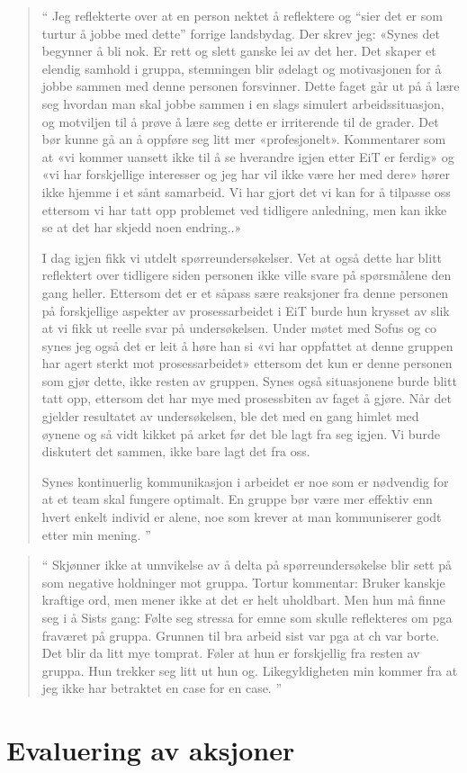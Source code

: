 \begin{quote}``
Jeg reflekterte over at en person nektet å reflektere og “sier det er som turtur å jobbe med dette” forrige 
landsbydag.  Der skrev jeg: «Synes det begynner å bli nok. Er rett og slett ganske lei av det her. Det skaper et 
elendig samhold i gruppa, stemningen blir ødelagt og motivasjonen for å jobbe sammen med denne personen 
forsvinner. Dette faget går ut på å lære seg hvordan man skal jobbe sammen i en slags simulert arbeidssituasjon, 
og motviljen til å prøve å lære seg dette er irriterende til de grader. Det bør kunne gå an å oppføre seg litt mer 
«profesjonelt». Kommentarer som at «vi kommer uansett ikke til å se hverandre igjen etter EiT er ferdig» og «vi har 
forskjellige interesser og jeg har vil ikke være her med dere» hører ikke hjemme i et sånt samarbeid. Vi har gjort det 
vi kan for å tilpasse oss ettersom vi har tatt opp problemet ved tidligere anledning, men kan ikke se at det har 
skjedd noen endring..»

I dag igjen fikk vi utdelt spørreundersøkelser. Vet at også dette har blitt reflektert over tidligere siden personen ikke 
ville svare på spørsmålene den gang heller. Ettersom det er et såpass sære reaksjoner fra denne personen på 
forskjellige aspekter av prosessarbeidet i EiT burde hun krysset av slik at vi fikk ut reelle svar på undersøkelsen. 
Under møtet med Sofus og co synes jeg også det er leit å høre han si «vi har oppfattet at denne gruppen har agert 
sterkt mot prosessarbeidet» ettersom det kun er denne personen som gjør dette, ikke resten av gruppen. Synes 
også situasjonene burde blitt tatt opp, ettersom det har mye med prosessbiten av faget å gjøre. Når det gjelder 
resultatet av undersøkelsen, ble det med en gang himlet med øynene og så vidt kikket på arket før det ble lagt fra 
seg igjen. Vi burde diskutert det sammen, ikke bare lagt det fra oss.

Synes kontinuerlig kommunikasjon i arbeidet er noe som er nødvendig for at et team skal fungere optimalt. En 
gruppe bør være mer effektiv enn hvert enkelt individ er alene, noe som krever at man kommuniserer godt etter min 
mening.
''\end{quote} 

\begin{quote}``
Skjønner ikke at unnvikelse av å delta på spørreundersøkelse blir sett på som negative holdninger mot gruppa. 
Tortur kommentar: Bruker kanskje kraftige ord, men mener ikke at det er helt uholdbart. Men hun må finne seg i å 
Sists gang: Følte seg stressa for emne som skulle reflekteres om pga fraværet på gruppa. 
Grunnen til bra arbeid sist var pga at ch var borte. Det blir da litt mye tomprat. 
Føler at hun er forskjellig fra resten av gruppa. Hun trekker seg litt ut hun og. 
Likegyldigheten min kommer fra at jeg ikke har betraktet en case for en case. 
''\end{quote} 

\section{Evaluering av aksjoner}